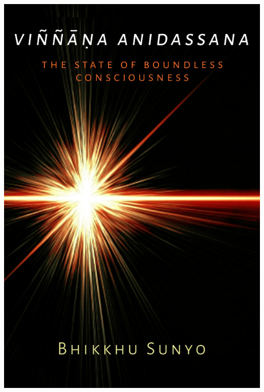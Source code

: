 \documentclass[10pt, openany]{book}
\begin{document}
\frontmatter

\pagestyle{empty}

\includegraphics[scale= 2, trim= 0 0 0 0]{../_resources/book-data/vasy/FrontLarge.jpg}

\newpage~\newpage~
\end{document}
